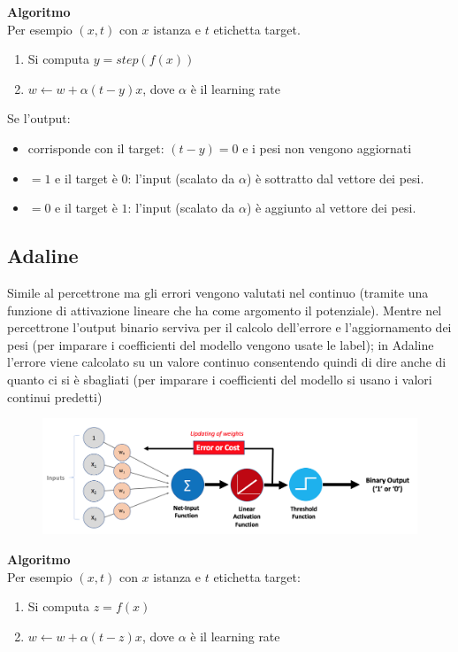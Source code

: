 \textbf{Algoritmo}\\
Per esempio $(x,t)$ con $x$ istanza e $t$ etichetta target.
\begin{enumerate}
    \item Si computa $y = step(f(x))$
    \item  $w \leftarrow w + \alpha(t-y)x$, dove $\alpha$ è il learning rate
\end{enumerate}
Se l’output: 
\begin{itemize}
    \item corrisponde con il target: $(t-y) = 0$ e i pesi non vengono aggiornati 
    \item $=1$ e il target è $0$: l’input (scalato da $\alpha$) è sottratto dal vettore dei pesi.
    \item $=0$ e il target è $1$: l’input (scalato da $\alpha$) è aggiunto al vettore dei pesi.
\end{itemize}
\subsection{Adaline}

Simile al percettrone ma gli errori vengono valutati nel continuo (tramite una funzione di attivazione lineare che ha come argomento il potenziale).
Mentre nel percettrone l’output binario serviva per il calcolo dell’errore e l’aggiornamento dei pesi (per imparare i coefficienti del modello vengono usate le label); in Adaline l’errore viene calcolato su un valore continuo consentendo quindi di dire anche di quanto ci si è sbagliati (per imparare i coefficienti del modello si usano i valori continui predetti)
\begin{figure}[H]
    \centering
    \includegraphics[scale = 0.5]{imm/perceptron_2.png}
\end{figure}

\textbf{Algoritmo}\\
Per esempio $(x,t)$ con $x$ istanza e $t$ etichetta target:
\begin{enumerate}
    \item Si computa $z = f(x)$
    \item  $w \leftarrow w + \alpha(t-z)x$, dove $\alpha$ è il learning rate
\end{enumerate}

